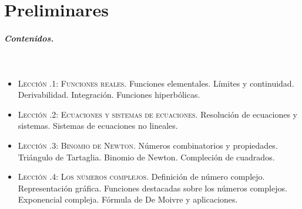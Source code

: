 %
%
%


\chapter{Preliminares}

\pagestyle{temas}
\thispagestyle{primera}




\paragraph{Contenidos.}\ 

\vspace{-1em}
\begin{itemize}
\item
{\scshape Lección \thechapter.1: Funciones reales.}
Funciones elementales. Límites y continuidad. Derivabilidad. Integración. Funciones hiperbólicas.

\item
{\scshape Lección \thechapter.2: Ecuaciones y sistemas de ecuaciones.} Resolución de ecuaciones y sistemas. Sistemas de ecuaciones no lineales.

\item
{\scshape Lección \thechapter.3: Binomio de Newton.} Números combinatorios y propiedades. Triángulo de Tartaglia. Binomio de Newton. Compleción de cuadrados.

\item
{\scshape Lección \thechapter.4: Los números complejos.}
Definición de número complejo. Representación gráfica. 
Funciones destacadas sobre los números complejos.
Exponencial compleja.
Fórmula de De Moivre y aplicaciones.
\end{itemize}

